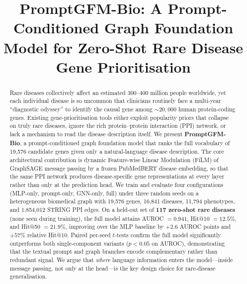 \documentclass[conference]{IEEEtran}
\begin{document}
\title{PromptGFM-Bio: A Prompt-Conditioned Graph Foundation Model for Zero-Shot Rare Disease Gene Prioritisation}

\author{
}

\maketitle

\begin{abstract}
Rare diseases collectively affect an estimated 300--400 million people worldwide, yet each individual disease is so uncommon that clinicians routinely face a multi-year ``diagnostic odyssey'' to identify the causal gene among $\sim\!\!20{,}000$ human protein-coding genes. Existing gene-prioritisation tools either exploit popularity priors that collapse on truly rare diseases, ignore the rich protein--protein interaction (PPI) network, or lack a mechanism to read the disease description itself. We present \textbf{PromptGFM-Bio}, a prompt-conditioned graph foundation model that ranks the full vocabulary of 19{,}576 candidate genes given only a natural-language disease description. The core architectural contribution is dynamic Feature-wise Linear Modulation (FiLM) of GraphSAGE message passing by a frozen PubMedBERT disease embedding, so that the same PPI network produces disease-specific gene representations at every layer rather than only at the prediction head. We train and evaluate four configurations (MLP-only, prompt-only, GNN-only, full) under three random seeds on a heterogeneous biomedical graph with 19{,}576 genes, 16{,}841 diseases, 11{,}794 phenotypes, and 1{,}854{,}012 STRING PPI edges. On a held-out set of \textbf{117 zero-shot rare diseases} (none seen during training), the full model attains AUROC $= 0.941$, Hit@10 $= 12.5\%$, and Hit@50 $= 21.9\%$, improving over the MLP baseline by $+2.6$ AUROC points and $+57\%$ relative Hit@10. Paired per-seed $t$-tests confirm the full model significantly outperforms both single-component variants ($p<0.05$ on AUROC), demonstrating that the textual prompt and graph branches encode complementary rather than redundant signal. We argue that \emph{where} language information enters the model---inside message passing, not only at the head---is the key design choice for rare-disease generalisation.
\end{abstract}
\end{document}
